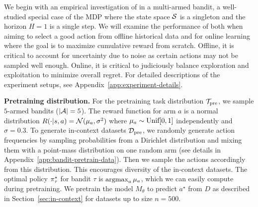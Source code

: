 
We begin with an empirical investigation of \macroName{} in a multi-armed bandit, a
well-studied special case of the MDP where the state space ${\mathcal{S}}$ is a singleton and the horizon $H = 1$ is a single step. We will examine the performance of \macroName{} both when aiming to select a good action from offline historical data and for online learning where the goal is to maximize cumulative reward from scratch. Offline, it is critical to account for uncertainty due to noise as certain actions may not be sampled well enough. Online, it is critical to judiciously balance exploration and exploitation to minimize overall regret. For detailed descriptions of the experiment setups, see Appendix~\ref{app:experiment-details}.


\textbf{Pretraining distribution.} For the pretraining task distribution ${\mathcal{T}}_{\text{pre}}$, we sample $5$-armed bandits ($|\mathcal{A}| = 5$). The reward function for arm $a$ is a normal distribution $R(\cdot | s,a) = \mathcal{N}(\mu_a, \sigma^2)$ where $\mu_a \sim \text{Unif}[0, 1]$ independently and $\sigma = 0.3$. To generate in-context datasets $\mathcal{D}_{\text{pre}}$, we randomly generate action frequencies by sampling probabilities from a Dirichlet distribution and mixing them with a point-mass distribution on one random arm (see details in Appendix~\ref{app:bandit-pretrain-data}). Then we sample the actions accordingly from  this distribution. This encourages diversity of the in-context datasets. The optimal policy $\pi^{\star}_{\tau}$ for bandit $\tau$ is $\mathop{\mathrm{argmax}}_{a} \mu_a$, which we can easily compute during pretraining. We pretrain the model $M_{\theta}$ to predict $a^\star$ from $D$ as described in Section~\ref{sec:in-context} for datasets up to size $n = 500$.


